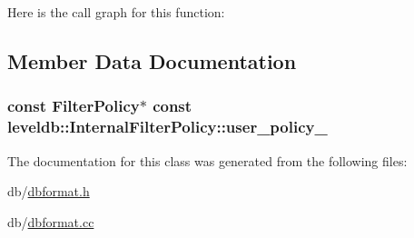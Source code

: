 Here is the call graph for this function\-:




\subsection{Member Data Documentation}
\hypertarget{classleveldb_1_1_internal_filter_policy_ab8fddd1a2c3c5325e92d6e19ee024f62}{
\subsubsection[{user\-\_\-policy\-\_\-}]{\setlength{\rightskip}{0pt plus 5cm}const {\bf Filter\-Policy}$\ast$ const leveldb\-::\-Internal\-Filter\-Policy\-::user\-\_\-policy\-\_\-\hspace{0.3cm}{\ttfamily [private]}}}\label{classleveldb_1_1_internal_filter_policy_ab8fddd1a2c3c5325e92d6e19ee024f62}


The documentation for this class was generated from the following files\-:\begin{DoxyCompactItemize}
\item 
db/\hyperlink{dbformat_8h}{dbformat.\-h}\item 
db/\hyperlink{dbformat_8cc}{dbformat.\-cc}\end{DoxyCompactItemize}
